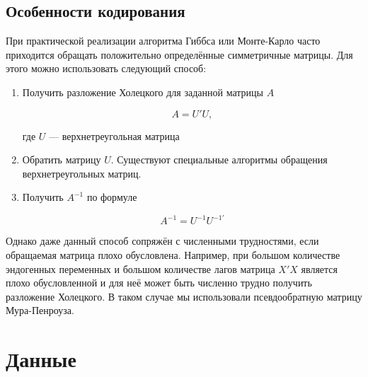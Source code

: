 \documentclass[11pt]{article} %
\begin{document}
\subsection{Особенности кодирования}

При практической реализации алгоритма Гиббса или Монте-Карло часто
приходится обращать положительно определённые симметричные матрицы.
Для этого можно использовать следующий способ:


\begin{enumerate}

\item Получить разложение Холецкого для заданной матрицы $A$

\[
A=U'U,
\]

где $U$ --- верхнетреугольная матрица

\item Обратить матрицу $U$. Существуют специальные алгоритмы обращения
верхнетреугольных матриц.

\item Получить $A^{-1}$ по формуле

\[
A^{-1}=U^{-1}U^{-1\prime}
\]

\end{enumerate}


Однако даже данный способ сопряжён с численными трудностями, если
обращаемая матрица плохо обусловлена. Например, при большом количестве
эндогенных переменных и большом количестве лагов матрица $X'X$
является плохо обусловленной и для неё может быть численно трудно
получить разложение Холецкого. В таком случае мы использовали
псевдообратную матрицу Мура-Пенроуза.


\section{Данные}
\end{document}
